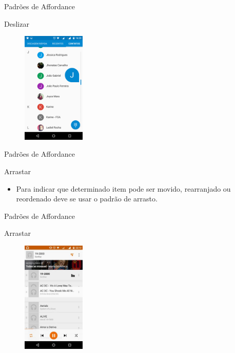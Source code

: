\begin{frame}{Padrões de Affordance}
\begin{block}{Deslizar}
    \begin{figure}
    \includegraphics[width=3cm]{figuras/deslize/deslize5}
    \end{figure}
\end{block}
\end{frame}

\begin{frame}{Padrões de Affordance}
\begin{block}{Arrastar}
  \begin{itemize}
    \item<1-> Para indicar que determinado item pode ser movido, rearranjado ou reordenado deve se usar o padrão de arrasto.
  \end{itemize}
\end{block}
\end{frame}

\begin{frame}{Padrões de Affordance}
\begin{block}{Arrastar}
    \begin{figure}
    \includegraphics[width=3cm]{figuras/arrast/arrast1}
    \end{figure}
\end{block}
\end{frame}

